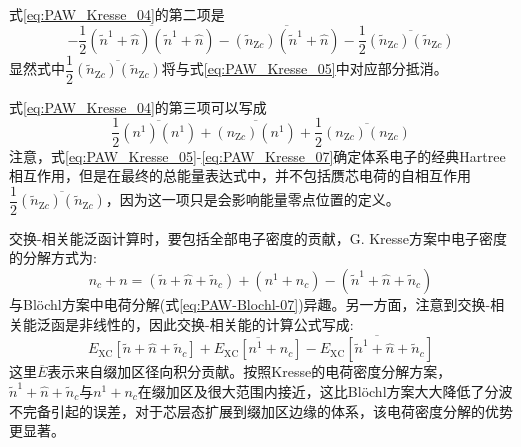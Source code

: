 式\eqref{eq:PAW_Kresse_04}的第二项是
\begin{equation}
	-\dfrac12\overline{(\tilde n^1+\hat n)(\tilde n^1+\hat n)}-\overline{(\tilde n_{\mathrm{Z}c})(\tilde n^1+\hat n)}-\dfrac12\overline{(\tilde n_{\mathrm{Z}c})(\tilde n_{\mathrm{Z}c})}
	\label{eq:PAW_Kresse_06}
\end{equation}
显然式中$\dfrac12\overline{(\tilde n_{\mathrm{Z}c})(\tilde n_{\mathrm{Z}c})}$将与式\eqref{eq:PAW_Kresse_05}中对应部分抵消。

式\eqref{eq:PAW_Kresse_04}的第三项可以写成
\begin{equation}
	\dfrac12\overline{(n^1)(n^1)}+\overline{(n_{\mathrm{Z}c})(n^1)}+\dfrac12\overline{(n_{\mathrm{Z}c})(n_{\mathrm{Z}c})}
	\label{eq:PAW_Kresse_07}
\end{equation}
注意，式\eqref{eq:PAW_Kresse_05}-\eqref{eq:PAW_Kresse_07}确定体系电子的经典\textrm{Hartree}相互作用，但是在最终的总能量表达式中，并不包括赝芯电荷的自相互作用$\dfrac12\overline{(\tilde n_{\mathrm{Z}c})(\tilde n_{\mathrm{Z}c})}$，因为这一项只是会影响能量零点位置的定义。

交换-相关能泛函计算时，要包括全部电子密度的贡献，\textrm{G. Kresse}方案中电子密度的分解方式为:~
\begin{equation}
	n_c+n=(\tilde n+\hat n+\tilde n_c)+(n^1+n_c)-(\tilde n^1+\hat n+\tilde n_c)
	\label{eq:PAW_Kresse_08}
\end{equation}
与\textrm{Bl\"ochl}方案中电荷分解(式\eqref{eq:PAW-Blochl-07})异趣。另一方面，注意到交换-相关能泛函是非线性的，因此交换-相关能的计算公式写成:~
\begin{equation}
	E_{\mathrm{XC}}[\tilde n+\hat n+\tilde n_c]+\overline{E_{\mathrm{XC}}[n^1+n_c]}-\overline{E_{\mathrm{XC}}[\tilde n^1+\hat n+\tilde n_c]}
	\label{eq:PAW_Kresse_09}
\end{equation}
这里$\overline{E}$表示来自缀加区径向积分贡献。按照\textrm{Kresse}的电荷密度分解方案，$\tilde n^1+\hat n+\tilde n_c$与$n^1+n_c$在缀加区及很大范围内接近，这比\textrm{Bl\"ochl}方案大大降低了分波不完备引起的误差，对于芯层态扩展到缀加区边缘的体系，该电荷密度分解的优势更显著。


